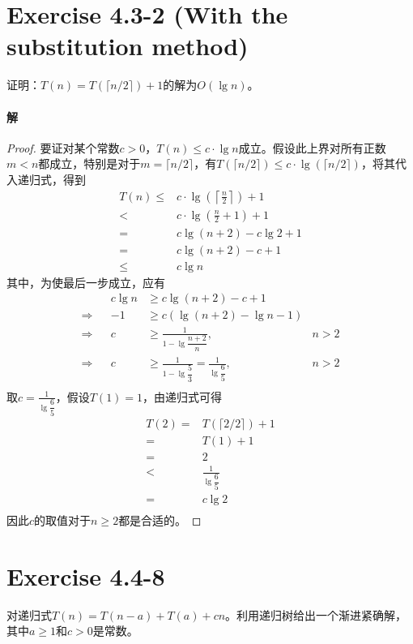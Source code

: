 \documentclass{article}
\begin{document}
\section{Exercise 4.3-2 (With the substitution method) }
证明：$T(n)=T(\lceil n/2 \rceil)+1$的解为$O(\lg{n})$。
\\

\paragraph{解}
\begin{proof}
要证对某个常数$c > 0$，$T(n) \leq c \cdot \lg{n}$成立。假设此上界对所有正数$m < n$都成立，特别是对于$m = \lceil n/2 \rceil$，有$T(\lceil n/2 \rceil) \leq c \cdot \lg{(\lceil n/2 \rceil)}$，将其代入递归式，得到
\begin{align*}
    T(n) \leq & c \cdot \lg{\left(\left\lceil \frac{n}{2} \right\rceil \right)} + 1 \\
    < & c \cdot \lg{\left( \frac{n}{2} + 1 \right)} + 1 \\
    =& c \lg{( n + 2 )} - c \lg{2} + 1 \\
    =& c \lg{( n + 2 )} - c + 1 \\
    \leq & c \lg{n}
\end{align*}
其中，为使最后一步成立，应有
\begin{align*}
    && c \lg{n} &\geq c \lg{(n + 2)} - c + 1 & \\
    \Rightarrow && -1 &\geq c \left(\lg{(n + 2)} - \lg{n} - 1 \right) & \\
    \Rightarrow && c &\geq \frac{1}{1 - \lg{\dfrac{n + 2}{n} }}, & n > 2 \\
    \Rightarrow && c &\geq \frac{1}{1 - \lg{\dfrac{5}{3}}} = \frac{1}{\lg{\dfrac{6}{5}}}, &  n > 2 \\
\end{align*}
取$c = \displaystyle \frac{1}{\lg{\dfrac{6}{5}}}$，假设$T(1) = 1$，由递归式可得
\begin{align*}
    T(2) =& T(\lceil 2/2 \rceil) + 1 \\
    =& T(1) + 1 \\
    =& 2 \\
    <& \frac{1}{\lg{\dfrac{6}{5}}} \\
    =& c \lg{2} \\
\end{align*}
因此$c$的取值对于$n \geq 2$都是合适的。
\end{proof}

\section{Exercise 4.4-8}
对递归式$T(n)=T(n-a)+T(a)+cn$。利用递归树给出一个渐进紧确解，其中$a \geq 1$和$c>0$是常数。
\\
\end{document}
